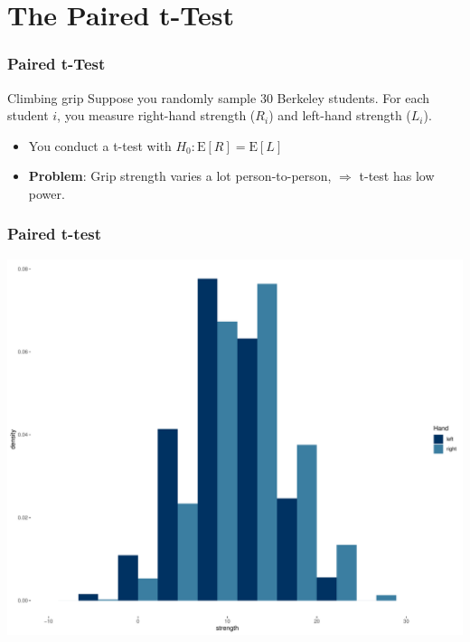 \documentclass[12pt, block=fill]{beamer}
\newcommand{\E}{\text{E}}
\begin{document}
\section{The Paired t-Test}

\begin{frame}
  \frametitle{Paired t-Test}

  \begin{exampleblock}{Climbing grip}
    Suppose you randomly sample 30 Berkeley students.  For each
    student $i$, you measure right-hand strength ($R_i$) and left-hand
    strength ($L_i$).

    \begin{itemize}
    \item You conduct a t-test with $H_0: \E[R] = \E[L]$
    \item \textbf{Problem}: Grip strength varies a lot
      person-to-person, $\Rightarrow$  t-test has low power.
    \end{itemize}
  \end{exampleblock}
\end{frame}

\begin{frame}
  \frametitle{Paired t-test}
  \centering
  \includegraphics[width=.9\linewidth]{./figures/histogram_unpaired.pdf}
\end{frame}
\end{document}
